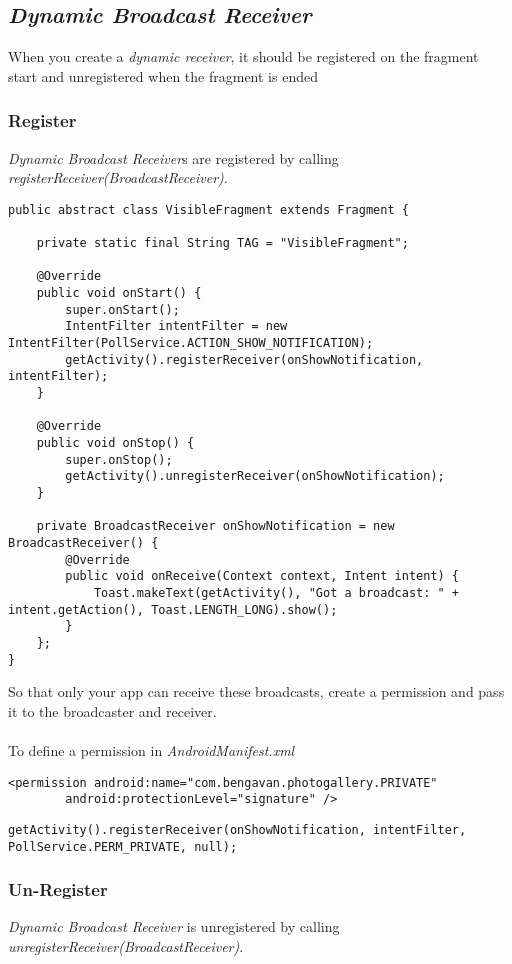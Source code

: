 \documentclass[]{article}
\renewcommand{\it}[1]{\textit{#1}}
\begin{document}
\subsection{\it{Dynamic Broadcast Receiver}}
When you create a \it{dynamic receiver}, it should be registered on the fragment start and unregistered when the fragment is ended
\subsubsection{Register}
\it{Dynamic Broadcast Receiver}s are registered by calling \it{registerReceiver(BroadcastReceiver)}.

\begin{lstlisting}
public abstract class VisibleFragment extends Fragment {
	
	private static final String TAG = "VisibleFragment";
	
	@Override
	public void onStart() {
		super.onStart();
		IntentFilter intentFilter = new IntentFilter(PollService.ACTION_SHOW_NOTIFICATION);
		getActivity().registerReceiver(onShowNotification, intentFilter);
	}
	
	@Override
	public void onStop() {
		super.onStop();
		getActivity().unregisterReceiver(onShowNotification);
	}
	
	private BroadcastReceiver onShowNotification = new BroadcastReceiver() {
		@Override
		public void onReceive(Context context, Intent intent) {
			Toast.makeText(getActivity(), "Got a broadcast: " + intent.getAction(), Toast.LENGTH_LONG).show();
		}
	};
}
\end{lstlisting}

So that only your app can receive these broadcasts, create a permission and pass it to the broadcaster and receiver.
\\\\
To define a permission in \it{AndroidManifest.xml}
\begin{lstlisting}
<permission android:name="com.bengavan.photogallery.PRIVATE"
		android:protectionLevel="signature" />
\end{lstlisting}

\begin{lstlisting}
getActivity().registerReceiver(onShowNotification, intentFilter, PollService.PERM_PRIVATE, null);
\end{lstlisting}

\subsubsection{Un-Register}
\it{Dynamic Broadcast Receiver} is unregistered by calling \it{unregisterReceiver(BroadcastReceiver)}.
\end{document}
